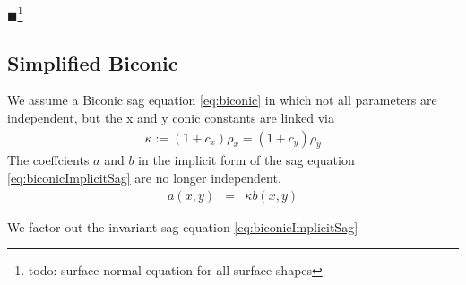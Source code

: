 \documentclass[12pt,a4paper,twoside,openright,BCOR10mm,headsepline,titlepage,abstracton,chapterprefix,final]{scrreprt}
\newcommand{\remark}[1]{{\color{red}$\blacksquare$}\footnote{{\color{red}#1}}}
\begin{document}
\remark{todo: surface normal equation for all surface shapes}

\subsection{Simplified Biconic}
We assume a Biconic sag equation \eqref{eq:biconic} in which not all parameters are independent, but the x and y conic constants are linked via
\begin{eqnarray}
 \kappa := (1 + c_x) \rho_x = (1 + c_y) \rho_y
\end{eqnarray}
The coeffcients $a$ and $b$ in the implicit form of the sag equation \ref{eq:biconicImplicitSag} are no longer independent.
\begin{eqnarray}
 a(x,y) &=& \kappa b(x,y) 
\end{eqnarray}

We factor out the invariant sag equation \ref{eq:biconicImplicitSag}
\end{document}
